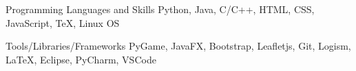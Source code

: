 
\begin{cvskills}
  \cvskill
    {Programming Languages and Skills} %
    {Python, Java, C/C++, HTML, CSS, JavaScript, TeX, Linux OS} %

  \cvskill
    {Tools/Libraries/Frameworks} %
    {PyGame,  JavaFX, Bootstrap, Leafletjs, Git, Logism, LaTeX, Eclipse, PyCharm, VSCode} %
\end{cvskills}
